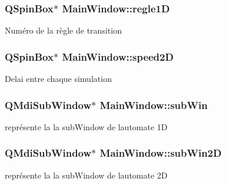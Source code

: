 \subsubsection[{\texorpdfstring{regle1D}{regle1D}}]{\setlength{\rightskip}{0pt plus 5cm}Q\+Spin\+Box$\ast$ Main\+Window\+::regle1D\hspace{0.3cm}{\ttfamily [private]}}\hypertarget{class_main_window_ad652e5a8e2bbf95af39779853bab4142}{}\label{class_main_window_ad652e5a8e2bbf95af39779853bab4142}
Numéro de la règle de transition 
\subsubsection[{\texorpdfstring{speed2D}{speed2D}}]{\setlength{\rightskip}{0pt plus 5cm}Q\+Spin\+Box$\ast$ Main\+Window\+::speed2D\hspace{0.3cm}{\ttfamily [private]}}\hypertarget{class_main_window_a062e8ba0040a577871dd29cadbade31b}{}\label{class_main_window_a062e8ba0040a577871dd29cadbade31b}
Delai entre chaque simulation 
\subsubsection[{\texorpdfstring{sub\+Win}{subWin}}]{\setlength{\rightskip}{0pt plus 5cm}Q\+Mdi\+Sub\+Window$\ast$ Main\+Window\+::sub\+Win\hspace{0.3cm}{\ttfamily [private]}}\hypertarget{class_main_window_ac18cc180f7f4908f63ce91487bf044cd}{}\label{class_main_window_ac18cc180f7f4908f63ce91487bf044cd}
représente la la sub\+Window de l\textquotesingle{}automate 1D 
\subsubsection[{\texorpdfstring{sub\+Win2D}{subWin2D}}]{\setlength{\rightskip}{0pt plus 5cm}Q\+Mdi\+Sub\+Window$\ast$ Main\+Window\+::sub\+Win2D\hspace{0.3cm}{\ttfamily [private]}}\hypertarget{class_main_window_a9e6a20036bfb2fe795858f32b0f72282}{}\label{class_main_window_a9e6a20036bfb2fe795858f32b0f72282}
représente la la sub\+Window de l\textquotesingle{}automate 2D 
